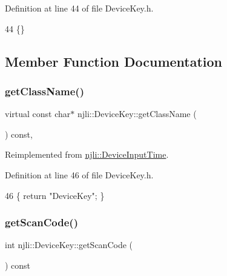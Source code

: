 Definition at line 44 of file Device\+Key.\+h.


\begin{DoxyCode}
44 \{\}
\end{DoxyCode}


\subsection{Member Function Documentation}
\mbox{\label{classnjli_1_1_device_key_a14f6e0865bbf44c100b34448e9d67f24}} 
\subsubsection{\texorpdfstring{get\+Class\+Name()}{getClassName()}}
{\footnotesize\ttfamily virtual const char$\ast$ njli\+::\+Device\+Key\+::get\+Class\+Name (\begin{DoxyParamCaption}{ }\end{DoxyParamCaption}) const\hspace{0.3cm}{\ttfamily [inline]}, {\ttfamily [virtual]}}



Reimplemented from \mbox{\hyperlink{classnjli_1_1_device_input_time_a2e5cdadd44d1ee2d7d7136e91f2bcafb}{njli\+::\+Device\+Input\+Time}}.



Definition at line 46 of file Device\+Key.\+h.


\begin{DoxyCode}
46 \{ \textcolor{keywordflow}{return} \textcolor{stringliteral}{"DeviceKey"}; \}
\end{DoxyCode}
\mbox{\label{classnjli_1_1_device_key_ab75e19e17395f72ec633f491ad502784}} 
\subsubsection{\texorpdfstring{get\+Scan\+Code()}{getScanCode()}}
{\footnotesize\ttfamily int njli\+::\+Device\+Key\+::get\+Scan\+Code (\begin{DoxyParamCaption}{ }\end{DoxyParamCaption}) const\hspace{0.3cm}{\ttfamily [inline]}}



